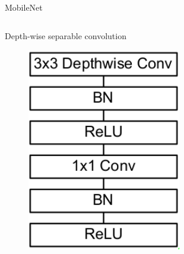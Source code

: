 \documentclass[xcolor=pdftex,dvipsnames,table,mathserif]{beamer}
\begin{document}


\begin{frame}{MobileNet \cite{howard_mobilenets:_2017}}


  \begin{columns}
    \begin{column}{.5\textwidth}
      \begin{block}{Depth-wise separable convolution}
        \begin{figure}[ht]
          \centering
          \includegraphics[width=0.6\textwidth]{dw_separable_conv}
        \end{figure}
      \end{block}

    \end{column}


\end{columns}
\end{frame}
\end{document}
